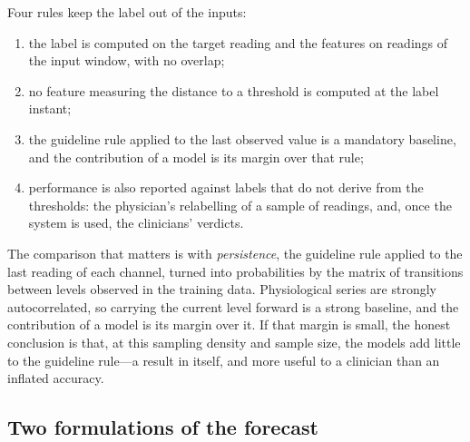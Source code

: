 Four rules keep the label out of the inputs:
\begin{enumerate}
  \item the label is computed on the target reading and the features on readings of the input window, with no overlap;
  \item no feature measuring the distance to a threshold is computed at the label instant;
  \item the guideline rule applied to the last observed value is a mandatory baseline, and the contribution of a model is its margin over that rule;
  \item performance is also reported against labels that do not derive from the thresholds: the physician's relabelling of a sample of readings, and, once the system is used, the clinicians' verdicts.
\end{enumerate}

The comparison that matters is with \emph{persistence}, the guideline rule applied to the last reading of each channel, turned into probabilities by the matrix of transitions between levels observed in the training data. Physiological series are strongly autocorrelated, so carrying the current level forward is a strong baseline, and the contribution of a model is its margin over it. If that margin is small, the honest conclusion is that, at this sampling density and sample size, the models add little to the guideline rule---a result in itself, and more useful to a clinician than an inflated accuracy.

\subsection{Two formulations of the forecast}

